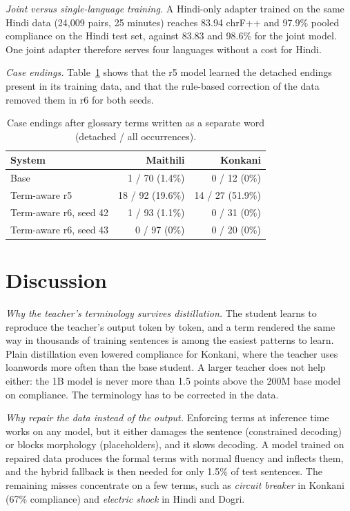 \documentclass[conference]{IEEEtran}
\begin{document}
\emph{Joint versus single-language training.} A Hindi-only adapter trained on the same Hindi data (24,009 pairs, 25 minutes) reaches 83.94 chrF++ and 97.9\% pooled compliance on the Hindi test set, against 83.83 and 98.6\% for the joint model. One joint adapter therefore serves four languages without a cost for Hindi.

\emph{Case endings.} Table~\ref{tab:case} shows that the r5 model learned the detached endings present in its training data, and that the rule-based correction of the data removed them in r6 for both seeds.

\begin{table}[t]
\caption{Case endings after glossary terms written as a separate word (detached / all occurrences).}
\label{tab:case}
\centering
\footnotesize
\begin{tabular}{@{}lrr@{}}
\toprule
System & Maithili & Konkani \\
\midrule
Base & 1 / 70 (1.4\%) & 0 / 12 (0\%) \\
Term-aware r5 & 18 / 92 (19.6\%) & 14 / 27 (51.9\%) \\
Term-aware r6, seed 42 & 1 / 93 (1.1\%) & 0 / 31 (0\%) \\
Term-aware r6, seed 43 & 0 / 97 (0\%) & 0 / 20 (0\%) \\
\bottomrule
\end{tabular}
\end{table}

\section{Discussion}

\emph{Why the teacher's terminology survives distillation.} The student learns to reproduce the teacher's output token by token, and a term rendered the same way in thousands of training sentences is among the easiest patterns to learn. Plain distillation even lowered compliance for Konkani, where the teacher uses loanwords more often than the base student. A larger teacher does not help either: the 1B model is never more than 1.5 points above the 200M base model on compliance. The terminology has to be corrected in the data.

\emph{Why repair the data instead of the output.} Enforcing terms at inference time works on any model, but it either damages the sentence (constrained decoding) or blocks morphology (placeholders), and it slows decoding. A model trained on repaired data produces the formal terms with normal fluency and inflects them, and the hybrid fallback is then needed for only 1.5\% of test sentences. The remaining misses concentrate on a few terms, such as \emph{circuit breaker} in Konkani (67\% compliance) and \emph{electric shock} in Hindi and Dogri.
\end{document}
